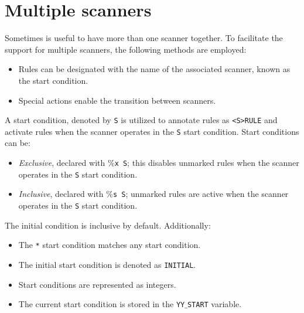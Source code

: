 \section{Multiple scanners}

Sometimes is useful to have more than one scanner together. 
To facilitate the support for multiple scanners, the following methods are employed:
\begin{itemize}
    \item Rules can be designated with the name of the associated scanner, known as the start condition.
    \item Special actions enable the transition between scanners.
\end{itemize}

A start condition, denoted by \texttt{S} is utilized to annotate rules as \texttt{<S>RULE} and activate rules when the scanner operates in the \texttt{S} start condition.
Start conditions can be:
\begin{itemize}
    \item \textit{Exclusive}, declared with \texttt{$\%$x S}; this disables unmarked rules when the scanner operates in the \texttt{S} start condition.
    \item \textit{Inclusive}, declared with \texttt{$\%$s S}; unmarked rules are active when the scanner operates in the \texttt{S} start condition.
\end{itemize}
The initial condition is inclusive by default.
Additionally:
\begin{itemize}
    \item The \texttt{*} start condition matches any start condition.
    \item The initial start condition is denoted as \texttt{INITIAL}.
    \item Start conditions are represented as integers.
    \item The current start condition is stored in the \texttt{YY$\_$START} variable.
\end{itemize}